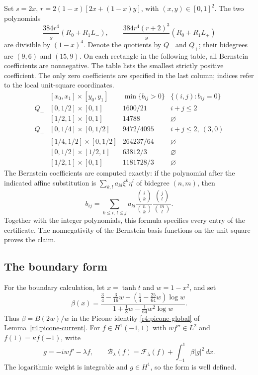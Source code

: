 \documentclass[reqno,11pt]{amsart}
\numberwithin{equation}{section}
\theoremstyle{remark}
\begin{document}
Set $s=2x$, $r=2(1-x)[2x+(1-x)y]$, with $(x,y)\in[0,1]^2$.
The two polynomials
\[
 \frac{384r^4}{s}(R_0+R_1L_-),\qquad
 \frac{384r^4(r+2)^3}{s}(R_0+R_1L_+)
\]
are divisible by $(1-x)^4$. Denote the quotients by $Q_-$ and $Q_+$;
their bidegrees are $(9,6)$ and $(15,9)$.
On each rectangle in the following table, all Bernstein coefficients
are nonnegative. The table lists the smallest strictly positive
coefficient. The only zero coefficients are specified in the last
column; indices refer to the local unit-square coordinates.
\[
\begin{array}{c|c|c|c}
 & [x_0,x_1]\times[y_0,y_1]&\min\{b_{ij}>0\}&\{(i,j):b_{ij}=0\}\\\hline
 Q_-&[0,1/2]\times[0,1]&1600/21&i+j\le2\\
 &[1/2,1]\times[0,1]&14788&\varnothing\\\hline
 Q_+&[0,1/4]\times[0,1/2]&9472/4095& i+j\le2,\ (3,0)\\
 &[1/4,1/2]\times[0,1/2]&264237/64&\varnothing\\
 &[0,1/2]\times[1/2,1]&63812/3&\varnothing\\
 &[1/2,1]\times[0,1]&1181728/3&\varnothing
\end{array}
\]
The Bernstein coefficients are computed exactly: if the polynomial
after the indicated affine substitution is
$\sum_{k,l}a_{kl}\xi^k\eta^l$ of bidegree $(n,m)$, then
\[
 b_{ij}=\sum_{k\le i,\,l\le j}
 a_{kl}\frac{\binom{i}{k}}{\binom{n}{k}}
        \frac{\binom{j}{l}}{\binom{m}{l}}.
\]
Together with the integer polynomials, this formula specifies every
entry of the certificate. The nonnegativity of the Bernstein basis
functions on the unit square proves the claim.

\subsection{The boundary form}
\label{sec:corrected-trace}

For the boundary calculation, let $x=\tanh t$ and $w=1-x^2$, and set
\[
 \beta(x)=\frac{\frac34-\frac3{16}w+
              (\frac14-\frac{25}{64}w)\log w}
                    {1+\frac18w-\frac1{64}w^2\log w}.
\]
Thus $\beta=B(2w)/w$ in the Picone identity
\eqref{r4:picone-global} of Lemma~\ref{r4:picone-current}. For
$f\in H^1(-1,1)$ with $wf''\in L^2$ and
$f(1)=\kappa f(-1)$, write
\[
 g=-iwf'-\lambda f,\qquad
 \mathcal B_\lambda(f)=\mathcal F_\lambda(f)
                                  +\int_{-1}^1\beta|g|^2\,dx.
\]
The logarithmic weight is integrable and $g\in H^1$, so the form
is well defined.
\end{document}
